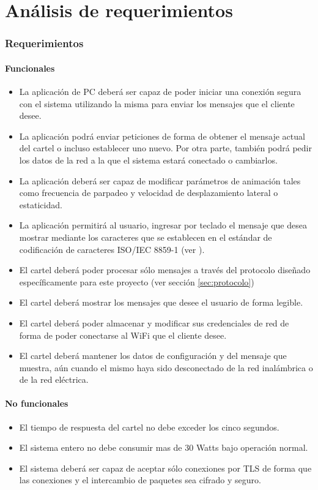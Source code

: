 \part{Análisis de requerimientos}\label{part:analisis}
\section{Requerimientos}
\subsection{Funcionales}
\begin{itemize}
	\item La aplicación de PC deberá ser capaz de poder iniciar una conexión segura con el sistema utilizando la misma para enviar los mensajes que el cliente desee.
	\item La aplicación podrá enviar peticiones de forma de obtener el mensaje actual del cartel o incluso establecer uno nuevo. Por otra parte, también podrá pedir los datos de la red a la que el sistema estará conectado o cambiarlos.
	\item La aplicación deberá ser capaz de modificar parámetros de animación tales como frecuencia de parpadeo y velocidad de desplazamiento lateral o estaticidad.
	\item La aplicación permitirá al usuario, ingresar por teclado el mensaje que desea mostrar mediante los caracteres que se establecen en el estándar de codificación de caracteres ISO/IEC 8859-1 (ver \cite{CodifChar}).
	\item El cartel deberá poder procesar sólo mensajes a través del protocolo diseñado específicamente para este proyecto (ver sección \ref{sec:protocolo})
	\item El cartel deberá mostrar los mensajes que desee el usuario de forma legible.
	\item El cartel deberá poder almacenar y modificar sus credenciales de red de forma de poder conectarse al WiFi que el cliente desee.
	\item El cartel deberá mantener los datos de configuración y del mensaje que muestra, aún cuando el mismo haya sido desconectado de la red inalámbrica o de la red eléctrica.
\end{itemize}

\subsection{No funcionales}
\begin{itemize}
	\item El tiempo de respuesta del cartel no debe exceder los cinco segundos.
	\item El sistema entero no debe consumir mas de 30 Watts bajo operación normal.
	\item El sistema deberá ser capaz de aceptar sólo conexiones por TLS \cite{TLS} de forma que las conexiones y el intercambio de paquetes sea cifrado y seguro.
\end{itemize}
